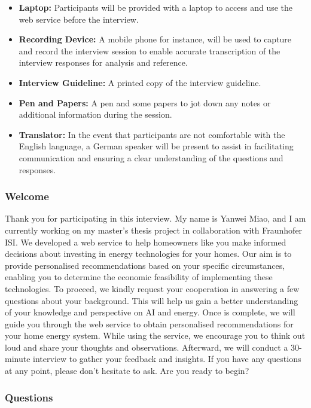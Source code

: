 \begin{itemize}
  \item \textbf{Laptop:} Participants will be provided with a laptop to access and use the web service before the interview. 
  \item \textbf{Recording Device:} A mobile phone for instance, will be used to capture and record the interview session to enable accurate transcription of the interview responses for analysis and reference.
  \item \textbf{Interview Guideline:} A printed copy of the interview guideline.
  \item \textbf{Pen and Papers:} A pen and some papers to jot down any notes or additional information during the session. 
  \item \textbf{Translator:} In the event that participants are not comfortable with the English language, a German speaker will be present to assist in facilitating communication and ensuring a clear understanding of the questions and responses.
\end{itemize}


\subsubsection{Welcome}

Thank you for participating in this interview. 
My name is Yanwei Miao, and I am currently working on my master's thesis project in collaboration with Fraunhofer ISI.
We developed a web service to help homeowners like you make informed decisions about investing in energy technologies for your homes. 
Our aim is to provide personalised recommendations based on your specific circumstances, enabling you to determine the economic feasibility of implementing these technologies. 
To proceed, we kindly request your cooperation in answering a few questions about your background. 
This will help us gain a better understanding of your knowledge and perspective on AI and energy. 
Once is complete, we will guide you through the web service to obtain personalised recommendations for your home energy system. 
While using the service, we encourage you to think out loud and share your thoughts and observations. 
Afterward, we will conduct a 30-minute interview to gather your feedback and insights. 
If you have any questions at any point, please don't hesitate to ask. 
Are you ready to begin?


\subsubsection{Questions}

